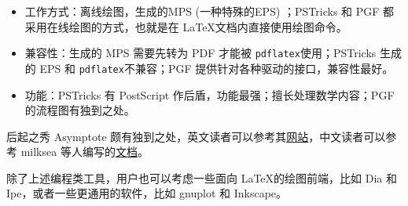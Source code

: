 \begin{itemize}
\item 工作方式：\MP 离线绘图，生成的MPS (一种特殊的EPS) ；PSTricks 和 PGF 都采用在线绘图的方式，也就是在 \LaTeX 文档内直接使用绘图命令。
\item 兼容性：\MP 生成的 MPS 需要先转为 PDF 才能被 \texttt{pdflatex}使用；PSTricks 生成的 EPS 和 \texttt{pdflatex}不兼容；PGF 提供针对各种驱动的接口，兼容性最好。
\item 功能：PSTricks 有 PostScript 作后盾，功能最强；\MP 擅长处理数学内容；PGF的流程图有独到之处。
\end{itemize}

后起之秀 Asymptote 颇有独到之处，英文读者可以参考其\href{http://asymptote.sourceforge.net/}{网站}，中文读者可以参考 milksea 等人编写的\href{http://bbs.ctex.org/viewthread.php?tid=47893&extra=page%3D1}{文档}。

除了上述编程类工具，用户也可以考虑一些面向 \LaTeX 的绘图前端，比如 Dia 和 Ipe，或者一些更通用的软件，比如 gnuplot 和 Inkscape。



